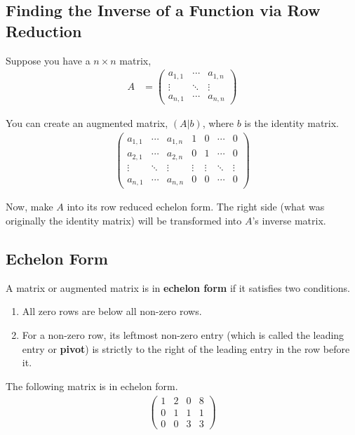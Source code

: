 \subsection{Finding the Inverse of a Function via Row Reduction}
\begin{strat}
    Suppose you have a $n \times n$ matrix,
    \begin{align*}
        A &= 
        \begin{pmatrix}
            a_{1,1} & \cdots & a_{1, n} \\
            \vdots & \ddots & \vdots \\
            a_{n, 1} & \cdots & a_{n, n}
        \end{pmatrix}
    \end{align*}

    You can create an augmented matrix, $(A | b)$, where $b$ is the identity matrix.
    \begin{align*}
        \left(\begin{array}{ccc|cccc}
            a_{1,1} & \cdots & a_{1,n} & 1 & 0 & \cdots & 0 \\
            a_{2, 1} & \cdots & a_{2, n} & 0 & 1 & \cdots & 0 \\ 
            \vdots  & \ddots & \vdots  & \vdots & \vdots & \ddots & \vdots \\
            a_{n,1} & \cdots & a_{n,n} & 0 & 0 & \cdots & 0
        \end{array}\right)
    \end{align*}

    Now, make $A$ into its row reduced echelon form. The right side (what was originally the identity matrix) will be transformed into $A$'s inverse
    matrix.
\end{strat}

\subsection{Echelon Form}
\begin{definition}
    A matrix or augmented matrix is in \textbf{echelon form} if it satisfies two conditions.
    \begin{enumerate}
        \item All zero rows are below all non-zero rows.
        \item For a non-zero row, its leftmost non-zero entry (which is called the leading entry or \textbf{pivot}) is strictly to the right of
        the leading entry in the row before it. 
    \end{enumerate}
    \begin{example}
        The following matrix is in echelon form.
        \begin{align*}
            \left(\begin{array}{ccc|c}
                1 & 2 & 0 & 8 \\
                0 & 1 & 1 & 1 \\
                0 & 0 & 3 & 3
            \end{array}\right)
        \end{align*}
    \end{example}
\end{definition}

